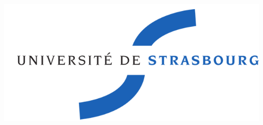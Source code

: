\documentclass[11pt]{mybook}
\begin{document}
\thispagestyle{empty}

\noindent\hrulefill\\

\noindent
\hfill\includegraphics[scale=0.20]{figures/logo_unistra}

\noindent\hrulefill\\
\end{document}

